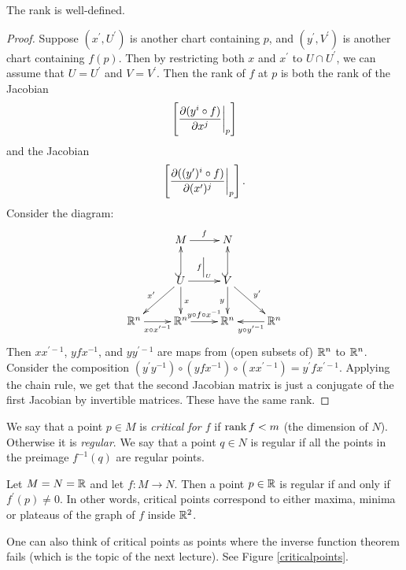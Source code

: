 \documentclass[11pt, english]{article}
\begin{document}
\begin{prop}
The rank is well-defined.
\end{prop}
\begin{proof}
Suppose $(x^\prime,U^\prime)$ is another chart containing $p$, and $(y^\prime,V^\prime)$ is another chart containing $f(p)$. Then by restricting both $x$ and $x^\prime$ to $U \cap U^\prime$, we can assume that $U=U^\prime$ and $V=V^\prime$. Then the rank of $f$ at $p$ is both the rank of the Jacobian
\[
\left[ \restr{\dd{(y^i \circ f)}{x^j}}p \right]
\]
and the Jacobian
\[
\left[ \restr{\dd{((y^\prime)^i \circ f)}{(x^\prime)^j}}p \right].
\]
Consider the diagram:
\[
\xymatrix{
& M \ar[r]^f & N \\
& \ar[dl]_{x^\prime} U \ar@{^(->}[u] \ar[d]^x \ar[r]^{\restr fU} & V \ar@{^(->}[u] \ar[d]_y  \ar[dr]^{y^\prime}\\
\R^n \ar[r]_{x \circ x^{\prime -1}} & \R^n \ar[r]^{y \circ f \circ x^{-1}} & \R^n & \ar[l]^{y \circ y^{\prime -1}}\R^n
}
\]
Then $xx^{\prime -1}$, $yfx^{-1}$, and $y y^{\prime -1}$ are maps from (open subsets of) $\mathbb{R}^n$ to $\mathbb{R}^n$. Consider the composition $(y^\prime y^{-1}) \circ (yfx^{-1}) \circ (xx^{\prime -1})=y^\prime f x^{\prime -1}$. Applying the chain rule, we get that the second Jacobian matrix is just a conjugate of the first Jacobian by invertible matrices. These have the same rank.
\end{proof}

We say that a point $p \in M$ is \emph{critical for $f$} if $\operatorname{\mathrm{rank}} f < m$ (the dimension of $N$). Otherwise it is \emph{regular}. We say that a point $q \in N$ is regular if all the points in the preimage $f^{-1}(q)$ are regular points.

\begin{example}
Let $M=N=\mathbb{R}$ and let $f:M \to N$. Then a point $p \in \mathbb{R}$ is regular if and only if $f^\prime(p) \neq 0$. In other words, critical points correspond to either maxima, minima or plateaus of the graph of $f$ inside $\mathbb{R}^2$.

One can also think of critical points as points where the inverse function theorem fails (which is the topic of the next lecture). See Figure \ref{criticalpoints}. %
\end{example}
\end{document}
